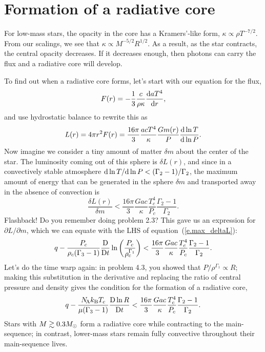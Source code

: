\section{Formation of a radiative core}

For low-mass stars, the opacity in the core has a Kramers'-like form, $\kappa \propto \rho T^{-7/2}$. From our scalings, we see that $\kappa \propto M^{-5/2} R^{1/2}$.  As a result, as the star contracts, the central opacity decreases.  If it decreases enough, then photons can carry the flux and a radiative core will develop.

To find out when a radiative core forms, let's start with our equation for the flux,
\[ F(r) = -\frac{1}{3}\frac{c}{\rho\kappa}\frac{\mathrm{d} aT^{4}}{\mathrm{d} r}, \]
and use hydrostatic balance to rewrite this as
\[ L(r) = 4\pi r^{2}F(r) = \frac{16\pi}{3}  \frac{acT^{4}}{\kappa} \frac{Gm(r)}{P} \frac{\mathrm{d} \ln T}{\mathrm{d} \ln P}. \]
Now imagine we consider a tiny amount of matter $\delta m$ about the center of the star.  The luminosity coming out of this sphere is $\delta L(r)$,  and since in a convectively stable atmosphere $\mathrm{d}\ln T/\mathrm{d}\ln P < (\Gamma_{2}-1)/\Gamma_{2}$, the maximum amount of energy that can be generated in the sphere $\delta m$ and transported away in the absence of convection is
\begin{equation}\label{e.max_deltaL}
  \frac{\delta L(r)}{\delta m} < \frac{16\pi}{3} \frac{Gac}{\kappa} \frac{T_{c}^{4}}{P_{c}}  \frac{\Gamma_{2}-1}{\Gamma_{2}}. 
\end{equation}
Flashback! Do you remember doing problem 2.3? This gave us an expression for $\partial L/\partial m$, which we can equate with the LHS of equation~(\ref{e.max_deltaL}):
\[
 q - \frac{P_{c}}{\rho_{c}(\Gamma_{3}-1)}\frac{\mathrm{D} }{\mathrm{D} t}\ln\left(\frac{P_{c}}{\rho_{c}^{\Gamma_{1}}}\right) <
 	\frac{16\pi}{3} \frac{Gac}{\kappa} \frac{T_{c}^{4}}{P_{c}}  \frac{\Gamma_{2}-1}{\Gamma_{2}}.
\]
Let's do the time warp again: in problem 4.3, you showed that $P/\rho^{\Gamma_{1}} \propto R$; making this substitution in the derivative and replacing the ratio of central pressure and density gives the condition for the formation of a radiative core,
\begin{equation}\label{e.formation-radiative-core}
q - \frac{N_\mathrm{\!A}k_\mathrm{B} T_{c}}{\mu(\Gamma_{3}-1)} \frac{\mathrm{D} \ln R}{\mathrm{D} t} < \frac{16\pi}{3} \frac{Gac}{\kappa} \frac{T_{c}^{4}}{P_{c}}  \frac{\Gamma_{2}-1}{\Gamma_{2}}.
\end{equation}
Stars with $M \gtrsim 0.3 M_\odot$ form a radiative core while contracting to the main-sequence; in contrast, lower-mass stars remain fully convective throughout their main-sequence lives.

